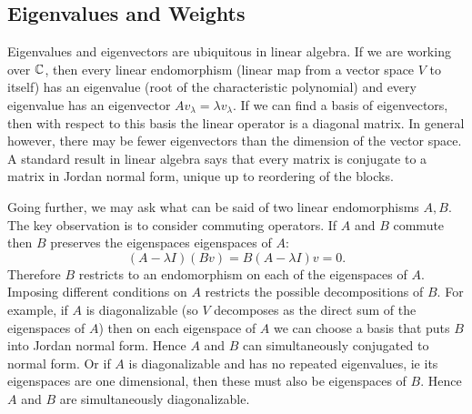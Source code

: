 
\subsection{Eigenvalues and Weights}

Eigenvalues and eigenvectors are ubiquitous in linear algebra.
If we are working over $\mathbb{C}$, then every linear endomorphism (linear map from a vector space $V$ to itself) has an eigenvalue (root of the characteristic polynomial) and every eigenvalue has an eigenvector $Av_\lambda = \lambda v_\lambda$.
If we can find a basis of eigenvectors, then with respect to this basis the linear operator is a diagonal matrix.
In general however, there may be fewer eigenvectors than the dimension of the vector space.
A standard result in linear algebra says that every matrix is conjugate to a matrix in Jordan normal form, unique up to reordering of the blocks.

Going further, we may ask what can be said of two linear endomorphisms $A,B$.
The key observation is to consider commuting operators.
If $A$ and $B$ commute then $B$ preserves the eigenspaces  eigenspaces of $A$:
\[
(A- \lambda I) (Bv) 
= B(A- \lambda I) v
= 0.
\]
Therefore $B$ restricts to an endomorphism on each of the eigenspaces of $A$.
Imposing different conditions on $A$ restricts the possible decompositions of $B$.
For example, if $A$ is diagonalizable (so $V$ decomposes as the direct sum of the eigenspaces of $A$) then on each eigenspace of $A$ we can choose a basis that puts $B$ into Jordan normal form.
Hence $A$ and $B$ can simultaneously conjugated to normal form.
Or if $A$ is diagonalizable and has no repeated eigenvalues, ie its eigenspaces are one dimensional, then these must also be eigenspaces of $B$.
Hence $A$ and $B$ are simultaneously diagonalizable.

